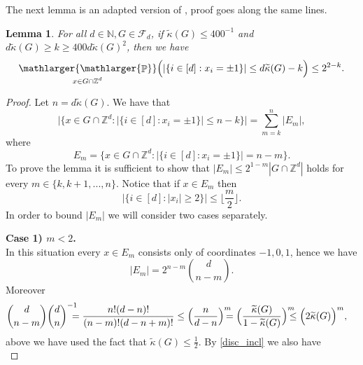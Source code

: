 \documentclass[a4paper,oneside, reqno]{amsart}
\numberwithin{equation}{section}
\newtheorem{Lem}[Thm]{Lemma}
\theoremstyle{definition}%
\theoremstyle{definition}
\theoremstyle{definition}%
\theoremstyle{definition}
\newcommand{\Pro}{\mathop{\mathbb{P}}}
\newcommand{\Z}{\mathbb{Z}}
\newcommand{\spr}[1]{\underset{_{\substack{#1}}}{\mathlarger{\mathlarger{\Pro}}}}
\begin{document}
The next lemma is an adapted version of \cite[Lemma 3.2]{balls}, proof goes along the same lines.
\begin{Lem} \label{BMSW a lot of 1}
For all $d \in \mathbb{N}, G \in \mathcal{F}_d$, if $\widetilde{\kappa}(G) \leq  400^{-1}$ and $d \widetilde{\kappa}(G) \geq k \geq 400 d \widetilde{\kappa}(G)^2$, then we have
\begin{equation*} 
\spr{x \in G \cap \Z^d} \Big(|\lbrace i \in [d]:x_i= \pm 1 \rbrace | \leq d \widetilde{\kappa}(G)-k \Big) \leq 2^{2-k} .  
\end{equation*} 
\end{Lem}
\begin{proof}
 Let $n=d \widetilde{\kappa}(G)$. We have that
\begin{equation} \label{eq:3.1}
 \Big| \Big\lbrace x \in G \cap \Z^d: |\lbrace i \in [d] :x_i= \pm 1 \rbrace | \leq n-k \Big\rbrace\Big|= \sum_{m=k}^n |E_m|, 
 \end{equation}
where 
\[ E_m= \Big\lbrace x \in G \cap \mathbb{Z}^d : |\lbrace i \in [d] :x_i= \pm 1 \rbrace | = n-m \Big\rbrace. \]
To prove the lemma it is sufficient to show that $|E_m| \leq 2^{1-m} |G \cap \mathbb{Z}^d|$ holds for every $m \in \lbrace k,k+1,...,n \rbrace$. Notice that if $x \in E_m$ then
\[ | \lbrace i \in [d]: |x_i| \geq 2 \rbrace | \leq \Big\lfloor \frac{m}{2} \Big\rfloor. \]
In order to bound $|E_m|$ we will consider two cases separately.
\par \textbf{Case 1) $m< 2$.} \\
In this situation every $x \in E_m$ consists only of coordinates $-1,0,1$, hence we have
\begin{equation*}
    |E_m| = 2^{n-m} \binom{d}{n-m}.
\end{equation*}
Moreover 
\begin{equation*} 
    \begin{split}
        &\binom{d}{n-m}  \binom{d}{n}^{-1} \hspace{-0.3cm}= \frac{n!(d-n)!}{(n-m)!(d-n+m)!} \le \Big( \frac{n}{d-n} \Big)^m\hspace{-0.3cm} = \Big( \frac{\widetilde{\kappa}(G)}{1-\widetilde{\kappa}(G)}  \Big)^m \hspace{-0.3cm}\le \Big( 2\widetilde{\kappa}(G)\Big)^m,
    \end{split}
\end{equation*} 
above we have used the fact that $\widetilde{\kappa}(G)\le \frac{1}{2}$.
By \eqref{disc_incl} we also have 
\begin{equation} \label{eq:3.2}

\end{equation}
\end{proof}
\end{document}

